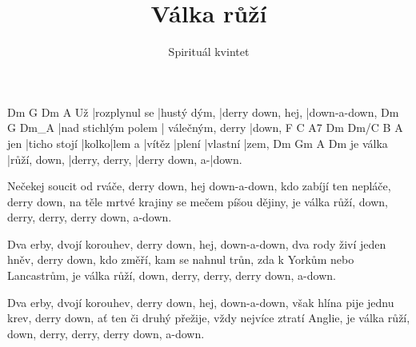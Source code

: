 \documentclass{song}
\title{Válka růží}
\author{Spirituál kvintet}
\begin{document}
\strophe
   Dm            G           Dm                A
Už |rozplynul se |hustý dým, |derry down, hej, |down-a-down,
Dm                  G                 Dm_A
|nad stichlým polem | válečným, derry |down,
    F            C     A7     Dm     Dm/C   B        A
jen |ticho stojí |kolko|lem a |vítěz |plení |vlastní |zem,
         Dm           Gm             A              Dm
je válka |růží, down, |derry, derry, |derry down, a-|down.
\endstrophe

\strophe*
Nečekej soucit od rváče, derry down, hej down-a-down,
kdo zabíjí ten nepláče, derry down,
na těle mrtvé krajiny se mečem píšou dějiny,
je válka růží, down, derry, derry, derry down, a-down.
\endstrophe

\strophe*
Dva erby, dvojí korouhev, derry down, hej, down-a-down,
dva rody živí jeden hněv, derry down,
kdo změří, kam se nahnul trůn, zda k Yorkům nebo Lancastrům,
je válka růží, down, derry, derry, derry down, a-down.
\endstrophe

\strophe*
Dva erby, dvojí korouhev, derry down, hej, down-a-down,
však hlína pije jednu krev, derry down,
ať ten či druhý přežije, vždy nejvíce ztratí Anglie,
je válka růží, down, derry, derry, derry down, a-down.
\endstrophe
\end{document}
